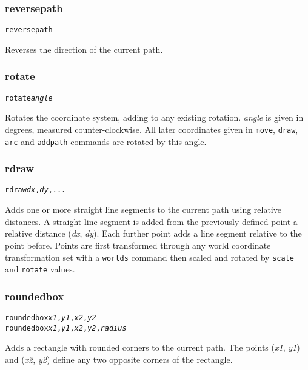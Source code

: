 \subsubsection{reversepath}

\begin{alltt}
reversepath
\end{alltt}

Reverses the direction of the current path.

\subsubsection{rotate}

\begin{alltt}
rotate \textit{angle}
\end{alltt}

Rotates the coordinate system, adding to any existing rotation.  \textit{angle}
is given in degrees, measured counter-clockwise.  All later coordinates given
in \texttt{move}, \texttt{draw}, \texttt{arc} and \texttt{addpath} commands are
rotated by this angle.

\subsubsection{rdraw}

\begin{alltt}
rdraw \textit{dx}, \textit{dy}, ...
\end{alltt}

Adds one or more straight line segments to the current path
using relative distances.
A straight line segment is added from the previously defined point
a relative distance (\textit{dx}, \textit{dy}).  Each further
point adds a line segment relative to the point before.
Points are first transformed through any world coordinate
transformation set with a \texttt{worlds} command
then scaled and rotated by \texttt{scale}
and \texttt{rotate} values.

\subsubsection{roundedbox}

\begin{alltt}
roundedbox \textit{x1}, \textit{y1}, \textit{x2}, \textit{y2}
roundedbox \textit{x1}, \textit{y1}, \textit{x2}, \textit{y2}, \textit{radius}
\end{alltt}

Adds a rectangle with rounded corners to the current path.
The points
(\textit{x1}, \textit{y1}) and (\textit{x2}, \textit{y2}) define
any two opposite corners of the rectangle.

